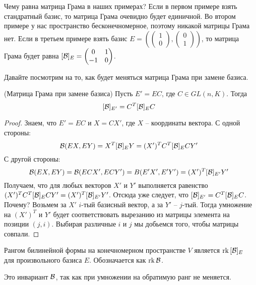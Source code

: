 Чему равна матрица Грама в наших примерах?
Если в первом примере взять стандратный базис, то матрица Грама очевидно будет единичной.
Во втором примере у нас пространство бесконечномерное, поэтому никакой матрицы Грама нет. 
Если в третьем примере взять базис $E = \left(\begin{pmatrix}
    1 \\ 0
\end{pmatrix}, \begin{pmatrix}
    0 \\ 1
\end{pmatrix} \right)$, то матрица Грама будет равна $[\mathcal{B}]_E = \begin{pmatrix}
    0 & 1 \\
    -1 & 0
\end{pmatrix}$.

\vspace*{5mm}

Давайте посмотрим на то, как будет меняться матрица Грама при замене базиса.

\begin{theorem}(Матрица Грама при замене базиса)
    Пусть $E' = EC$, где $C \in GL(n, K)$.
    Тогда \[ [\mathcal{B}]_{E'} = C^T[\mathcal{B}]_EC \]
\end{theorem}
\begin{proof}
    Знаем, что $E' = EC$ и $X = CX'$, где $X$ -- координаты вектора.
    С одной стороны: \[ \mathcal{B}(EX, EY) = X^T[\mathcal{B}]_EY = (X')^TC^T[\mathcal{B}]_ECY' \]
    \quad С другой стороны: \[ \mathcal{B}(EX, EY) = \mathcal{B}(ECX', ECY') = B(E'X', E'Y') = (X')^T[\mathcal{B}]_{E'}Y' \]
    \quad Получаем, что для любых векторов $X'$ и $Y'$ выполняется равенство $(X')^TC^T[\mathcal{B}]_ECY' = (X')^T[\mathcal{B}]_{E'}Y'$.
    Отсюда уже следует, что $[\mathcal{B}]_{E'} = C^T[\mathcal{B}]_EC$.
    Почему?
    Возьмем за $X'$ $i$-тый базисный вектор, а за $Y'$ -- $j$-тый.
    Тогда умножение на $(X')^T$ и $Y'$ будет соответствовать вырезанию из матрицы элемента на позиции $(j, i)$.
    Выбирая различные $i$ и $j$ мы добьемся того, чтобы матрицы совпали.
\end{proof}

\vspace*{5mm}

\begin{conj}
    Рангом билинейной формы на конечномерном пространстве $V$ является $\operatorname{rk}{[\mathcal{B}]_E}$ для произвольного базиса $E$.
    Обозначается как $\operatorname{rk}{\mathcal{B}}$.
\end{conj}

\notice Это инвариант $\mathcal{B}$, так как при умножении на обратимую ранг не меняется.

